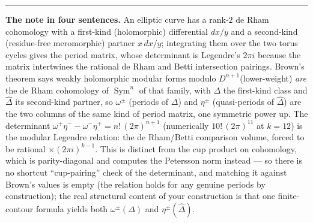 \documentclass[11pt]{article}
\newcommand{\Dhat}{\widehat{\Delta}}
\DeclareMathOperator{\Sym}{Sym}
\begin{document}
\bigskip\hrule\bigskip

\noindent\textbf{The note in four sentences.}
An elliptic curve has a rank-$2$ de Rham cohomology with a first-kind
(holomorphic) differential $dx/y$ and a second-kind (residue-free
meromorphic) partner $x\,dx/y$; integrating them over the two torus cycles
gives the period matrix, whose determinant is Legendre's $2\pi i$ because
the matrix intertwines the rational de Rham and Betti intersection
pairings. Brown's theorem says weakly holomorphic modular forms modulo
$D^{n+1}$(lower-weight) \emph{are} the de Rham cohomology of $\Sym^n$ of
that family, with $\Delta$ the first-kind class and $\Dhat$ its second-kind
partner, so $\omega^\pm$ (periods of $\Delta$) and $\eta^\pm$
(quasi-periods of $\Dhat$) are the two columns of the same kind of period
matrix, one symmetric power up. The determinant $\omega^+\eta^- -
\omega^-\eta^+ = n!\,(2\pi)^{n+1}$ (numerically $10!\,(2\pi)^{11}$ at
$k=12$) is the modular Legendre relation: the de Rham/Betti comparison
volume, forced to be rational $\times (2\pi i)^{k-1}$. This is distinct
from the cup product on cohomology, which is parity-diagonal and computes
the Petersson norm instead --- so there is no shortcut ``cup-pairing''
check of the determinant, and matching it against Brown's values is
empty (the relation holds for any genuine periods by construction); the
real structural content of your construction is that one finite-contour
formula yields both $\omega^\pm(\Delta)$ and $\eta^\pm(\Dhat)$.
\end{document}
